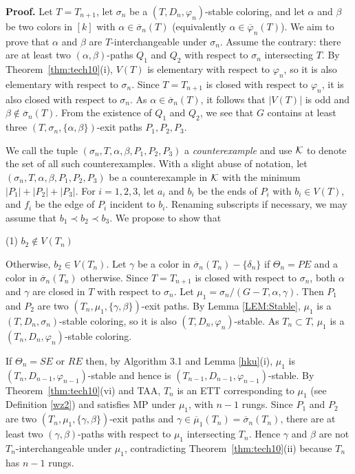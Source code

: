 \documentclass[11pt]{article}
\newcommand{\phibar}{\overline{\varphi}}
\newcommand{\phiv}{\varphi}
\begin{document}
{\bf Proof.} Let $T=T_{n+1}$, let $\sigma_n$ be a $(T, D_n, \phiv_{n})$-stable coloring, and let   
$\alpha$ and $\beta$ be two colors in $[k]$ with $\alpha\in \overline{\sigma}_n(T)$ (equivalently 
$\alpha\in \phibar_{n}(T)$). We aim to prove that $\alpha$ and $\beta$ are $T$-interchangeable under
$\sigma_n$. Assume the contrary: there are at least two $(\alpha,\beta)$-paths $Q_1$ and $Q_2$ with respect to $\sigma_n$ intersecting 
$T$. By Theorem~\ref{thm:tech10}(i), $V(T)$ is elementary with respect to $\varphi_n$, so it is also elementary with 
respect to $\sigma_n$. Since $T=T_{n+1}$ is closed with respect to $\varphi_n$, it is also closed with respect to $\sigma_n$. 
As $\alpha\in \overline{\sigma}_n(T)$, it follows that $|V(T)|$ is odd and $\beta \notin \overline{\sigma}_n(T)$. 
From the existence of $Q_1$ and $Q_2$, we see that $G$ contains at least three $(T, \sigma_n, \{\alpha, \beta\})$-exit paths $P_1,P_2,P_3$.

We call the tuple $(\sigma_n, T, \alpha, \beta, P_1,P_2,P_3)$ a {\em counterexample} and use 
${\cal K}$ to denote the set of all such counterexamples.
% 
With a slight abuse of notation, let $(\sigma_n, T, \alpha, \beta, P_1,P_2,P_3)$ be a counterexample in ${\cal K}$ with the minimum $|P_1|+|P_2|+|P_3|$. For $i=1,2,3$, let $a_i$ and $b_i$ be the 
ends of $P_i$ with $b_i \in V(T)$, and $f_i$ be the edge of $P_i$ incident to $b_i$.  Renaming subscripts if necessary, 
we may assume that $b_1\prec b_2 \prec b_3$.  We propose to show that

(1) $b_2 \notin V(T_n)$ 

Otherwise, $b_2 \in V(T_n)$. Let $\gamma$ be a color in $\overline{\sigma}_n(T_n)-\{\delta_n\}$ if $\Theta_n=PE$ and a color in $\overline{\sigma}_n(T_n)$ 
otherwise.  Since $T=T_{n+1}$ is closed with respect to $\sigma_n$, both $\alpha$ and $\gamma$ are closed in 
$T$ with respect to $\sigma_n$. Let $\mu_1=\sigma_n/ (G-T,\alpha,\gamma)$.  Then $P_1$ and $P_2$ are two $(T_n, \mu_1, \{\gamma, \beta\})$-exit paths. 
By Lemma \ref{LEM:Stable}, $\mu_1$ is a $(T,D_n,\sigma_n)$-stable coloring, so it is also $(T,D_n,\varphi_n)$-stable. As $T_n\subset T$, 
$\mu_1$ is a $(T_n,D_n,\varphi_n)$-stable coloring. 

If $\Theta_n=SE$ or $RE$ then, by Algorithm 3.1 and Lemma \ref{hku}(i), $\mu_1$ is $(T_n,D_{n-1},\varphi_{n-1})$-stable and hence is 
$(T_{n-1},D_{n-1},\varphi_{n-1})$-stable. By Theorem~\ref{thm:tech10}(vi) and TAA, $T_n$ is an ETT corresponding to $\mu_1$ (see Definition 
\ref{wz2}) and satisfies MP under $\mu_1$, with $n-1$ rungs. Since $P_1$ and $P_2$ are two $(T_n, \mu_1, \{\gamma, \beta\})$-exit paths and 
$\gamma\in\overline{\mu}_1(T_n)=\overline{\sigma}_n(T_n)$, there are at least two $(\gamma, \beta)$-paths with respect to $\mu_1$ intersecting 
$T_n$. Hence $\gamma$ and $\beta$ are not $T_n$-interchangeable under $\mu_1$, contradicting Theorem~\ref{thm:tech10}(ii) because $T_n$ has $n-1$ rungs.  
\end{document}
